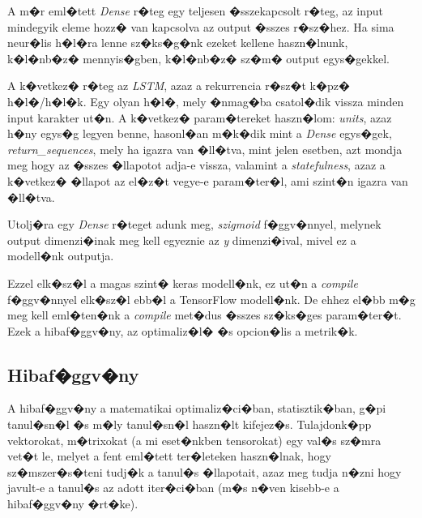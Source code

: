 \documentclass[12pt]{report}
\theoremstyle{definition}
\begin{document}
A m�r eml�tett \textit{Dense} r�teg egy teljesen �sszekapcsolt r�teg, az input mindegyik eleme hozz� van kapcsolva az output �sszes r�sz�hez. Ha sima neur�lis h�l�ra lenne sz�ks�g�nk ezeket kellene haszn�lnunk, k�l�nb�z� mennyis�gben, k�l�nb�z� sz�m� output egys�gekkel.

A k�vetkez� r�teg az \textit{LSTM}, azaz a rekurrencia r�sz�t k�pz� h�l�/h�l�k. Egy olyan h�l�, mely �nmag�ba csatol�dik vissza minden input karakter ut�n. A k�vetkez� param�tereket haszn�lom: \textit{units}, azaz h�ny egys�g legyen benne, hasonl�an m�k�dik mint a \textit{Dense} egys�gek, \textit{return\_sequences}, mely ha igazra van �ll�tva, mint jelen esetben, azt mondja meg hogy az �sszes �llapotot adja-e vissza, valamint a \textit{statefulness}, azaz a k�vetkez� �llapot az el�z�t vegye-e param�ter�l, ami szint�n igazra van �ll�tva.

Utolj�ra egy \textit{Dense} r�teget adunk meg, \textit{szigmoid} f�ggv�nnyel, melynek output dimenzi�inak meg kell egyeznie az \textit{y} dimenzi�ival, mivel ez a modell�nk outputja.

Ezzel elk�sz�l a magas szint� keras modell�nk, ez ut�n a \textit{compile} f�ggv�nnyel elk�sz�l ebb�l a TensorFlow modell�nk. De ehhez el�bb m�g meg kell eml�ten�nk a \textit{compile} met�dus �sszes sz�ks�ges param�ter�t. Ezek a hibaf�ggv�ny, az optimaliz�l� �s opcion�lis a metrik�k.

\subsection{Hibaf�ggv�ny}
A hibaf�ggv�ny a matematikai optimaliz�ci�ban, statisztik�ban, g�pi tanul�sn�l �s m�ly tanul�sn�l haszn�lt kifejez�s. Tulajdonk�pp vektorokat, m�trixokat (a mi eset�nkben tensorokat) egy val�s sz�mra vet�t le, melyet a fent eml�tett ter�leteken haszn�lnak, hogy sz�mszer�s�teni tudj�k a tanul�s �llapotait, azaz meg tudja n�zni hogy javult-e a tanul�s az adott iter�ci�ban (m�s n�ven kisebb-e a hibaf�ggv�ny �rt�ke).
\end{document}
